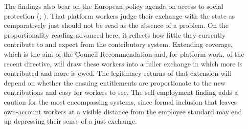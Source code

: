 \documentclass[
  12pt,
]{article}
\begin{document}
The findings also bear on the European policy agenda on access to social
protection
(;
). That platform
workers judge their exchange with the state as comparatively just should
not be read as the absence of a problem. On the proportionality reading
advanced here, it reflects how little they currently contribute to and
expect from the contributory system. Extending coverage, which is the
aim of the Council Recommendation and, for platform work, of the recent
directive, will draw these workers into a fuller exchange in which more
is contributed and more is owed. The legitimacy returns of that
extension will depend on whether the ensuing entitlements are
proportionate to the new contributions and easy for workers to see. The
self-employment finding adds a caution for the most encompassing
systems, since formal inclusion that leaves own-account workers at a
visible distance from the employee standard may end up depressing their
sense of a just exchange.
\end{document}
